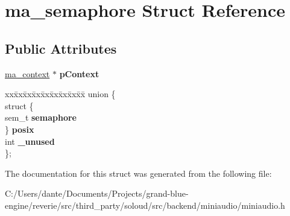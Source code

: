 \hypertarget{structma__semaphore}{}\section{ma\+\_\+semaphore Struct Reference}
\label{structma__semaphore}
\subsection*{Public Attributes}
\begin{DoxyCompactItemize}
\item 
\mbox{\label{structma__semaphore_a54d1e7fd2c81c862faefd2db0e5dd674}} 
\mbox{\hyperlink{structma__context}{ma\+\_\+context}} $\ast$ {\bfseries p\+Context}
\item 
\mbox{\label{structma__semaphore_a72bb0a660686561fbea23c8d4d7aa8fc}} 
\begin{tabbing}
xx\=xx\=xx\=xx\=xx\=xx\=xx\=xx\=xx\=\kill
union \{\\
\>struct \{\\
\>\>sem\_t {\bfseries semaphore}\\
\>\} {\bfseries posix}\\
\>int {\bfseries \_unused}\\
\}; \\

\end{tabbing}\end{DoxyCompactItemize}


The documentation for this struct was generated from the following file\+:\begin{DoxyCompactItemize}
\item 
C\+:/\+Users/dante/\+Documents/\+Projects/grand-\/blue-\/engine/reverie/src/third\+\_\+party/soloud/src/backend/miniaudio/miniaudio.\+h\end{DoxyCompactItemize}
